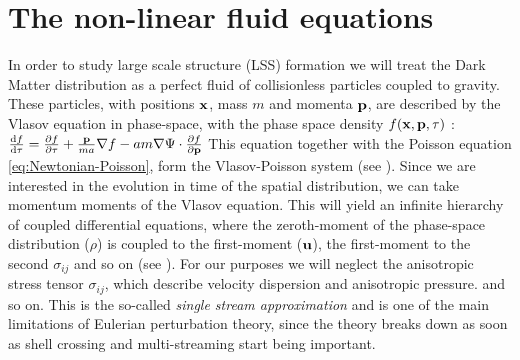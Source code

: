 \section{The non-linear fluid equations \label{sec:nonlinear-fluid}}

In order to study large scale structure (LSS) formation we will treat the Dark
Matter distribution as a perfect fluid of collisionless particles
coupled to gravity. These particles, with positions $\mathbf{x}$, mass
$m$ and momenta $\mathbf{p}$, are described by the Vlasov equation
in phase-space, with the phase space density $f(\mathbf{x}, \mathbf{p}, \tau)$
:
\beeqp$
\frac{\mathrm{d} {f} }{\mathrm{d} {\tau}} = \frac{\partial{f}}{\partial{\tau}} + \frac{\mathbf{p}}{m a} \nabla f -
a m \nabla \Psi \cdot \frac{\partial{f}}{\partial{\mathbf{p}}}
$
This equation together with the Poisson equation \cref{eq:Newtonian-Poisson},
form the Vlasov-Poisson system (see \cite{bernardeau_large-scale_2001}).
Since we are interested in the evolution in time of the spatial distribution,
we can take momentum moments of the Vlasov equation. This will yield
an infinite hierarchy of coupled differential equations, where the zeroth-moment
of the phase-space distribution ($\rho$) is coupled to the first-moment ($\mathbf{u}$),
the first-moment to the second $\sigma_{ij}$ and so on (see \cite{bernardeau_large-scale_2001}).
For our purposes we will neglect the anisotropic stress tensor $\sigma_{ij}$,
which describe velocity dispersion and anisotropic pressure.
and so on.
This is the so-called \emph{single stream approximation} and is one of
the main limitations of Eulerian perturbation theory, since the theory
breaks down as soon as shell crossing and multi-streaming start being
important.


